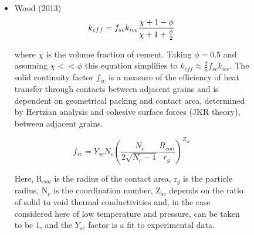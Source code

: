 \documentclass[11pt]{article} %
\begin{document}
\begin{figure}[ht]
\begin{Table}
\begin{Comment}
	\begin{itemize}
	\item Wood (2013)
		\begin{equation}
		k_{eff}  = f_{sc} k_{ice} \frac{\chi + 1 - \phi}{\chi + 1 + \frac{\phi}{2}} \\
		\end{equation}
		
		where $\chi$ is the volume fraction of cement. Taking $\phi = 0.5$ and assuming $\chi << \phi$ this equation simplifies to $k_{eff} \approx \frac{2}{5} f_{sc} k_{ice}$.  The solid continuity factor $f_{sc}$ is a measure of the efficiency of heat transfer through contacts between adjacent grains and is dependent on geometrical packing and contact area, determined by Hertzian analysis and cohesive surface forces (JKR theory), between adjacent grains.
		
		\begin{equation}
		f_{sc} = Y_{sc}N_{c} \left( \frac{N_{c}}{2\sqrt{N_{c}-1}} \frac{R_{con}}{r_{g}} \right)^{Z_{sc}}
		\end{equation}
	
	Here, R$_{con}$ is the radius of the contact area, r$_{g}$ is the particle radius, N$_{c}$ is the coordination number, Z$_{sc}$ depends on the ratio of solid to void thermal conductivities and, in the case considered here of low temperature and pressure, can be taken to be 1, and the $Y_{sc}$ factor is a fit to experimental data. %
	
		


\end{itemize}
\end{Comment}
\end{Table}
\end{figure}
\end{document}
